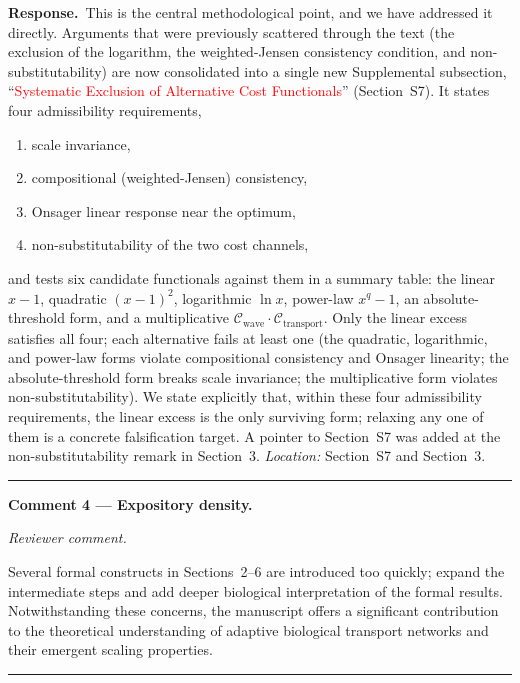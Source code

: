 \documentclass[11pt]{article}
\newcommand{\rtwo}[1]{\textcolor{red}{#1}}
\newenvironment{comment}%
  {\par\medskip\noindent\itshape\color{black!75} Reviewer comment.\par\nobreak}%
  {\par\nobreak\noindent\rule{\linewidth}{0.4pt}\medskip}
\newcommand{\response}{\par\medskip\noindent\textbf{Response.}\ }
\begin{document}
\response This is the central methodological point, and we have addressed it
directly. Arguments that were previously scattered through the text (the
exclusion of the logarithm, the weighted-Jensen consistency condition, and
non-substitutability) are now consolidated into a single new Supplemental
subsection, ``\rtwo{Systematic Exclusion of Alternative Cost Functionals}''
(Section~S7). It states four admissibility
requirements,
\begin{enumerate}[label=(\roman*),leftmargin=2.2em,itemsep=1pt,topsep=2pt]
  \item scale invariance,
  \item compositional (weighted-Jensen) consistency,
  \item Onsager linear response near the optimum,
  \item non-substitutability of the two cost channels,
\end{enumerate}
and tests six candidate functionals against them in a summary table: the linear $x-1$, quadratic $(x-1)^2$,
logarithmic $\ln x$, power-law $x^q-1$, an absolute-threshold form, and a
multiplicative $\mathcal{C}_{\mathrm{wave}}\cdot\mathcal{C}_{\mathrm{transport}}$.
Only the linear excess satisfies all four; each alternative fails at least one
(the quadratic, logarithmic, and power-law forms violate compositional
consistency and Onsager linearity; the absolute-threshold form breaks scale
invariance; the multiplicative form violates non-substitutability). We state
explicitly that, within these four admissibility requirements, the linear excess
is the only surviving form; relaxing any one of them is a concrete falsification
target. A pointer to Section~S7 was added at the
non-substitutability remark in Section~3. \emph{Location:} Section~S7 and
Section~3.

\bigskip
\hrule
\bigskip
\noindent\textbf{Comment 4 --- Expository density.}
\begin{comment}
Several formal constructs in Sections~2--6 are introduced too quickly; expand
the intermediate steps and add deeper biological interpretation of the formal
results. Notwithstanding these concerns, the manuscript offers a significant
contribution to the theoretical understanding of adaptive biological transport
networks and their emergent scaling properties.
\end{comment}
\end{document}

